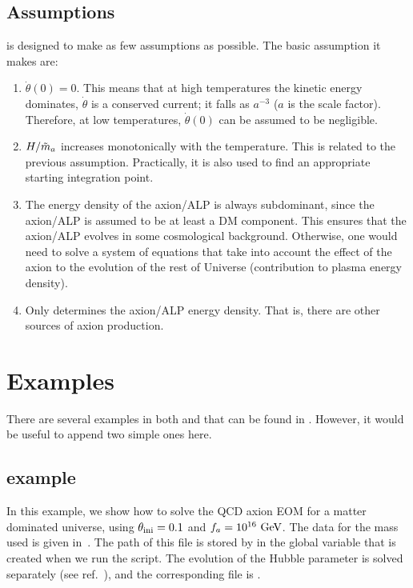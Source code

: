 \documentclass[a4paper,11pt]{article}
\begin{document}
	\subsection{Assumptions}
	\mimes is designed to make as few assumptions as possible. The basic assumption it makes are:
	\begin{enumerate}
		\item $\dot \theta(0)=0$. This means that at high temperatures the kinetic energy dominates, $\dot \theta$ is a conserved current; \ie it falls as $a^{-3}$ ($a$ is the scale factor). Therefore, at low temperatures, $\dot \theta(0)$ can be assumed to be negligible.   
		\item $H/\tilde m_{a}{}$ increases monotonically with the temperature. This is related to the previous assumption. Practically, it is also used to find an appropriate starting integration point. 
		\item The energy density of the axion/ALP is always subdominant, since the axion/ALP is assumed to be at least a DM component. This ensures that the axion/ALP evolves in some cosmological background. Otherwise, one would need to solve a system of equations that take into account the effect of the axion to the evolution of the rest of Universe (\eg contribution to plasma energy density).
		\item Only  determines the axion/ALP energy density. That is, there are other sources of axion production.
	\end{enumerate}	
	
	
\section{Examples}
%
	There are several examples in both \CPP and \PY that can be found in . However, it would be useful to append two simple ones here.
	
	\subsection{\CPP example}
	In this example, we show how to solve the QCD axion EOM for a matter dominated universe, using $\theta_{\rm ini}{}=0.1$ and $f_{a}{}=10^{16}~{\rm GeV}$. The data for the mass used is given in~\cite{Borsanyi:2016ksw}. The path of this file is stored by in the global variable  that is created when we run the  script.	The evolution of the Hubble parameter is solved separately (see \eg ref.~\cite{Arias:2020qty}), and the corresponding file is .   
	
\end{document}
